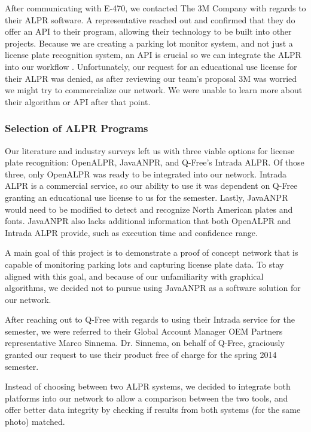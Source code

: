 \documentclass[11pt, oneside, fullpage, doublespace]{article}
\begin{document}
After communicating with E-470, we contacted The 3M Company with regards to their ALPR software. A representative reached out and confirmed that they do offer an API to their program, allowing their technology to be built into other projects. Because we are creating a parking lot monitor system, and not just a license plate recognition system, an API is crucial so we can integrate the ALPR into our workflow \cite{mmmalpr}. Unfortunately, our request for an educational use license for their ALPR was denied, as after reviewing our team's proposal 3M was worried we might try to commercialize our network. We were unable to learn more about their algorithm or API after that point.

\subsubsection{Selection of ALPR Programs}
Our literature and industry surveys left us with three viable options for license plate recognition: OpenALPR, JavaANPR, and Q-Free's Intrada ALPR. Of those three, only OpenALPR was ready to be integrated into our network. Intrada ALPR is a commercial service, so our ability to use it was dependent on Q-Free granting an educational use license to us for the semester. Lastly, JavaANPR would need to be modified to detect and recognize North American plates and fonts. JavaANPR also lacks additional information that both OpenALPR and Intrada ALPR provide, such as execution time and confidence range.

A main goal of this project is to demonstrate a proof of concept network that is capable of monitoring parking lots and capturing license plate data. To stay aligned with this goal, and because of our unfamiliarity with graphical algorithms, we decided not to pursue using JavaANPR as a software solution for our network.

After reaching out to Q-Free with regards to using their Intrada service for the semester, we were referred to their Global Account Manager OEM Partners representative Marco Sinnema. Dr. Sinnema, on behalf of Q-Free, graciously granted our request to use their product free of charge for the spring 2014 semester.

Instead of choosing between two ALPR systems, we decided to integrate both platforms into our network to allow a comparison between the two tools, and offer better data integrity by checking if results from both systems (for the same photo) matched.
\end{document}
